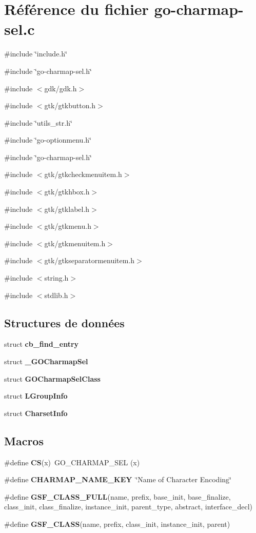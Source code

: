 \section{Référence du fichier go-\/charmap-\/sel.c}
\label{go-charmap-sel_8c}
{\ttfamily \#include \char`\"{}include.h\char`\"{}}\par
{\ttfamily \#include \char`\"{}go-\/charmap-\/sel.h\char`\"{}}\par
{\ttfamily \#include $<$gdk/gdk.h$>$}\par
{\ttfamily \#include $<$gtk/gtkbutton.h$>$}\par
{\ttfamily \#include \char`\"{}utils\_\-str.h\char`\"{}}\par
{\ttfamily \#include \char`\"{}go-\/optionmenu.h\char`\"{}}\par
{\ttfamily \#include \char`\"{}go-\/charmap-\/sel.h\char`\"{}}\par
{\ttfamily \#include $<$gtk/gtkcheckmenuitem.h$>$}\par
{\ttfamily \#include $<$gtk/gtkhbox.h$>$}\par
{\ttfamily \#include $<$gtk/gtklabel.h$>$}\par
{\ttfamily \#include $<$gtk/gtkmenu.h$>$}\par
{\ttfamily \#include $<$gtk/gtkmenuitem.h$>$}\par
{\ttfamily \#include $<$gtk/gtkseparatormenuitem.h$>$}\par
{\ttfamily \#include $<$string.h$>$}\par
{\ttfamily \#include $<$stdlib.h$>$}\par
\subsection*{Structures de données}
\begin{DoxyCompactItemize}
\item 
struct {\bf cb\_\-find\_\-entry}
\item 
struct {\bf \_\-GOCharmapSel}
\item 
struct {\bf GOCharmapSelClass}
\item 
struct {\bf LGroupInfo}
\item 
struct {\bf CharsetInfo}
\end{DoxyCompactItemize}
\subsection*{Macros}
\begin{DoxyCompactItemize}
\item 
\#define {\bf CS}(x)~GO\_\-CHARMAP\_\-SEL (x)
\item 
\#define {\bf CHARMAP\_\-NAME\_\-KEY}~\char`\"{}Name of Character Encoding\char`\"{}
\item 
\#define {\bf GSF\_\-CLASS\_\-FULL}(name, prefix, base\_\-init, base\_\-finalize, class\_\-init, class\_\-finalize, instance\_\-init, parent\_\-type, abstract, interface\_\-decl)
\item 
\#define {\bf GSF\_\-CLASS}(name, prefix, class\_\-init, instance\_\-init, parent)
\end{DoxyCompactItemize}
